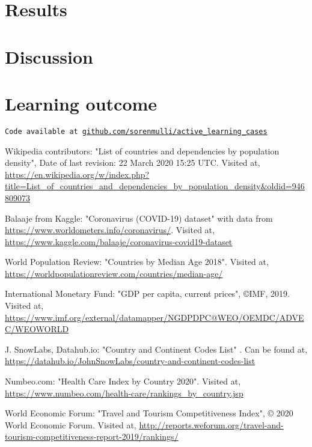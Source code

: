 \documentclass[12pt,fleqn]{article}
\begin{document}
\begin{multicols}{2}
			

	\section{Results} %
		

		\section{Discussion} %
			
		\section{Learning outcome} %
			
	\end{multicols}

\newpage
\texttt{Code available at \url{github.com/sorenmulli/active_learning_cases}}
	\begin{thebibliography}{9}
	
	
		
		 Wikipedia contributors: "List of countries and dependencies by population density", Date of last revision: 22 March 2020 15:25 UTC. Visited at,  \url{ https://en.wikipedia.org/w/index.php?title=List_of_countries_and_dependencies_by_population_density&oldid=946809073}
		
		 Balaaje from Kaggle: "Coronavirus (COVID-19) dataset" with data from \url{https://www.worldometers.info/coronavirus/}. Visited at, \url{https://www.kaggle.com/balaaje/coronavirus-covid19-dataset}
		
		 World Population Review: "Countries by Median Age 2018". Visited at, \url{https://worldpopulationreview.com/countries/median-age/}
		
		 International Monetary Fund: "GDP per capita, current prices", ©IMF, 2019. Visited at, \url{https://www.imf.org/external/datamapper/NGDPDPC@WEO/OEMDC/ADVEC/WEOWORLD}
		
		 J. SnowLabs, Datahub.io: "Country and Continent Codes List" . Can be found at, \url{https://datahub.io/JohnSnowLabs/country-and-continent-codes-list}
		
		 Numbeo.com: "Health Care Index by Country 2020". Visited at, \url{https://www.numbeo.com/health-care/rankings_by_country.jsp}
		
		 World Economic Forum: "Travel and Tourism Competitiveness Index", © 2020 World Economic Forum. Visited at, \url{http://reports.weforum.org/travel-and-tourism-competitiveness-report-2019/rankings/}
		
		
		
		
		
	\end{thebibliography}
	
	
	
\end{document}
